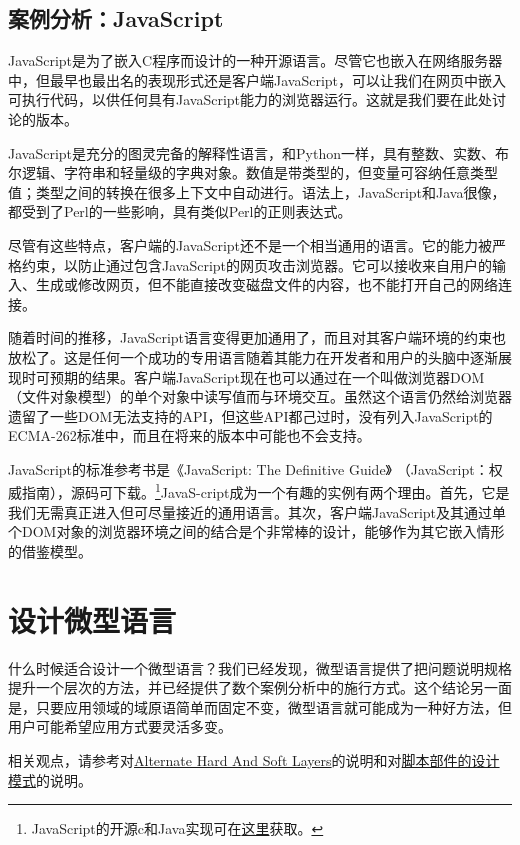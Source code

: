 \documentclass[12pt,oneside]{book}
\begin{document}
\subsection{案例分析：JavaScript}
JavaScript是为了嵌入C程序而设计的一种开源语言。尽管它也嵌入在网络服务器中，但最早也最出名的表现形式还是客户端JavaScript，可以让我们在网页中嵌入可执行代码，以供任何具有JavaScript能力的浏览器运行。这就是我们要在此处讨论的版本。

JavaScript是充分的图灵完备的解释性语言，和Python一样，具有整数、实数、布尔逻辑、字符串和轻量级的字典对象。数值是带类型的，但变量可容纳任意类型值；类型之间的转换在很多上下文中自动进行。语法上，JavaScript和Java很像，都受到了Perl的一些影响，具有类似Perl的正则表达式。

尽管有这些特点，客户端的JavaScript还不是一个相当通用的语言。它的能力被严格约束，以防止通过包含JavaScript的网页攻击浏览器。它可以接收来自用户的输入、生成或修改网页，但不能直接改变磁盘文件的内容，也不能打开自己的网络连接。

随着时间的推移，JavaScript语言变得更加通用了，而且对其客户端环境的约束也放松了。这是任何一个成功的专用语言随着其能力在开发者和用户的头脑中逐渐展现时可预期的结果。客户端JavaScript现在也可以通过在一个叫做浏览器DOM（文件对象模型）的单个对象中读写值而与环境交互。虽然这个语言仍然给浏览器遗留了一些DOM无法支持的API，但这些API都己过时，没有列入JavaScript的ECMA-262标准中，而且在将来的版本中可能也不会支持。

JavaScript的标准参考书是《JavaScript: The Definitive Guide》 （JavaScript：权威指南）\cite{FlanaganJavaScript}，源码可下载。\footnote{JavaScript的开源c和Java实现可在\href{http://www.mozilla.org/js/}{这里}获取。}JavaS-cript成为一个有趣的实例有两个理由。首先，它是我们无需真正进入但可尽量接近的通用语言。其次，客户端JavaScript及其通过单个DOM对象的浏览器环境之间的结合是个非常棒的设计，能够作为其它嵌入情形的借鉴模型。



\section{设计微型语言}
什么时候适合设计一个微型语言？我们已经发现，微型语言提供了把问题说明规格提升一个层次的方法，并已经提供了数个案例分析中的施行方式。这个结论另一面是，只要应用领域的域原语简单而固定不变，微型语言就可能成为一种好方法，但用户可能希望应用方式要灵活多变。

相关观点，请参考对\href{http://www.c2.com/cgi/wiki?AlternateHardAndSoftLayers}{Alternate  Hard  And  Soft  Layers}的说明和对\href{http://www.doc.ic.ac.uk/~np2/patterns/scripting/scripting.html}{脚本部件的设计模式}的说明。
\end{document}
